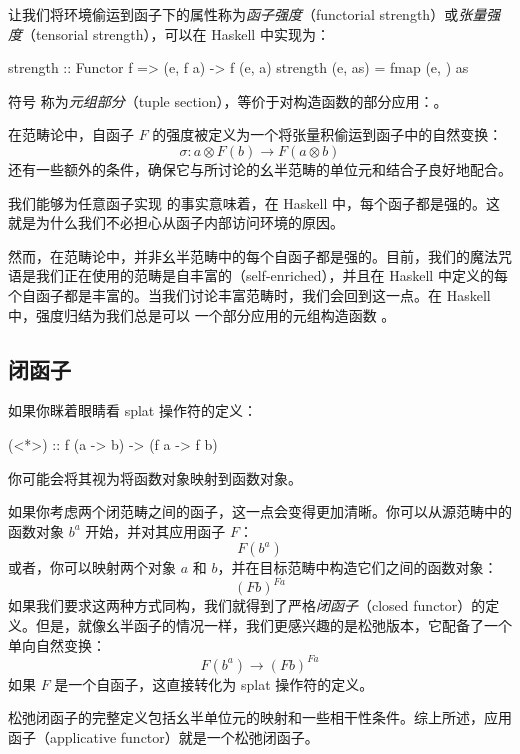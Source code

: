 \documentclass[DaoFP]{subfiles}
\begin{document}
让我们将环境偷运到函子下的属性称为\emph{函子强度}（functorial strength）或\emph{张量强度}（tensorial strength），可以在 Haskell 中实现为：
\begin{haskell}
strength :: Functor f => (e, f a) -> f (e, a)
strength (e, as) = fmap (e, ) as
\end{haskell}
符号  称为\emph{元组部分}（tuple section），等价于对构造函数的部分应用：。

在范畴论中，自函子 $F$ 的强度被定义为一个将张量积偷运到函子中的自然变换：
\[ \sigma \colon a \otimes F(b) \to F (a \otimes b) \]
还有一些额外的条件，确保它与所讨论的幺半范畴的单位元和结合子良好地配合。

我们能够为任意函子实现  的事实意味着，在 Haskell 中，每个函子都是强的。这就是为什么我们不必担心从函子内部访问环境的原因。

然而，在范畴论中，并非幺半范畴中的每个自函子都是强的。目前，我们的魔法咒语是我们正在使用的范畴是自丰富的（self-enriched），并且在 Haskell 中定义的每个自函子都是丰富的。当我们讨论丰富范畴时，我们会回到这一点。在 Haskell 中，强度归结为我们总是可以  一个部分应用的元组构造函数 。

\subsection{闭函子}

如果你眯着眼睛看 splat 操作符的定义：
\begin{haskell}
(<*>) :: f (a -> b) -> (f a -> f b)
\end{haskell}
你可能会将其视为将函数对象映射到函数对象。

如果你考虑两个闭范畴之间的函子，这一点会变得更加清晰。你可以从源范畴中的函数对象 $b^a$ 开始，并对其应用函子 $F$：
\[ F (b^a) \]
或者，你可以映射两个对象 $a$ 和 $b$，并在目标范畴中构造它们之间的函数对象：
\[ (F b)^{F a} \]
如果我们要求这两种方式同构，我们就得到了严格\emph{闭函子}（closed functor）的定义。但是，就像幺半函子的情况一样，我们更感兴趣的是松弛版本，它配备了一个单向自然变换：
\[ F (b^a) \to (F b)^{F a} \]
如果 $F$ 是一个自函子，这直接转化为 splat 操作符的定义。

松弛闭函子的完整定义包括幺半单位元的映射和一些相干性条件。综上所述，应用函子（applicative functor）就是一个松弛闭函子。
\end{document}
